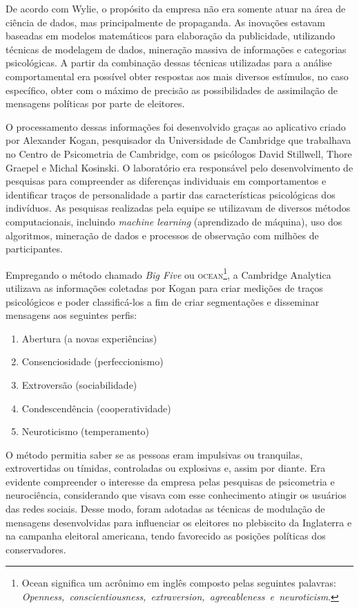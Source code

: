 De acordo com Wylie, o propósito da empresa não era somente atuar na
área de ciência de dados, mas principalmente de propaganda. As inovações
estavam baseadas em modelos matemáticos para elaboração da publicidade,
utilizando técnicas de modelagem de dados, mineração massiva de
informações e categorias psicológicas. A partir da combinação dessas
técnicas utilizadas para a análise comportamental era possível obter
respostas aos mais diversos estímulos, no caso específico, obter com o
máximo de precisão as possibilidades de assimilação de mensagens
políticas por parte de eleitores.

O processamento dessas informações foi desenvolvido graças ao aplicativo
criado por Alexander Kogan, pesquisador da Universidade de Cambridge que
trabalhava no Centro de Psicometria de Cambridge, com os psicólogos
David Stillwell, Thore Graepel e Michal Kosinski. O laboratório era
responsável pelo desenvolvimento de pesquisas para compreender as
diferenças individuais em comportamentos e identificar traços de
personalidade a partir das características psicológicas dos indivíduos.
As pesquisas realizadas pela equipe se utilizavam de diversos métodos
computacionais, incluindo \textit{machine learning} (aprendizado de máquina), uso
dos algoritmos, mineração de dados e processos de observação com milhões
de participantes.

Empregando o método chamado \textit{Big Five} ou \textsc{ocean}\footnote{Ocean
  significa um acrônimo em inglês composto pelas seguintes palavras: \textit{Openness,~conscientiousness,~extraversion,~agreeableness~e~neuroticism}.},
a Cambridge Analytica utilizava as informações coletadas por Kogan para
criar medições de traços psicológicos e poder classificá-los a fim de criar segmentações e disseminar mensagens aos seguintes perfis:

\begin{enumerate}
\item Abertura (a novas experiências)
\item Consenciosidade (perfeccionismo)
\item Extroversão (sociabilidade)
\item Condescendência (cooperatividade)
\item Neuroticismo (temperamento)
\end{enumerate}

O método permitia saber se as pessoas eram impulsivas ou tranquilas,
extrovertidas ou tímidas, controladas ou explosivas e, assim por diante.
Era evidente compreender o interesse da empresa pelas pesquisas de
psicometria e neurociência, considerando que visava com esse
conhecimento atingir os usuários das redes sociais. Desse modo, foram
adotadas as técnicas de modulação de mensagens desenvolvidas para
influenciar os eleitores no plebiscito da Inglaterra e na campanha
eleitoral americana, tendo favorecido as posições políticas dos
conservadores.

